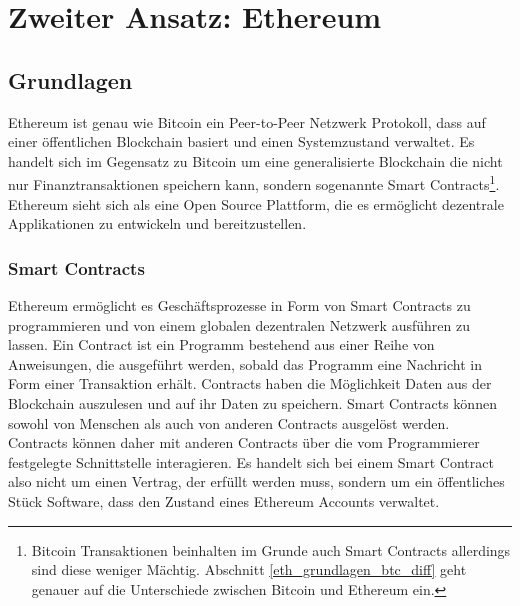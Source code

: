 \chapter{Zweiter Ansatz: Ethereum} %

\label{eth} %

\section{Grundlagen}
Ethereum ist genau wie Bitcoin ein Peer-to-Peer Netzwerk Protokoll, dass auf einer öffentlichen Blockchain basiert und einen Systemzustand verwaltet. Es handelt sich im Gegensatz zu Bitcoin um eine generalisierte Blockchain die nicht nur Finanztransaktionen speichern kann, sondern sogenannte Smart Contracts\footnote{Bitcoin Transaktionen beinhalten im Grunde auch Smart Contracts allerdings sind diese weniger Mächtig. Abschnitt \ref{eth_grundlagen_btc_diff} geht genauer auf die Unterschiede zwischen Bitcoin und Ethereum ein.}. Ethereum sieht sich als eine Open Source Plattform, die es ermöglicht dezentrale Applikationen zu entwickeln und bereitzustellen.

\subsection{Smart Contracts}
Ethereum ermöglicht es Geschäftsprozesse in Form von Smart Contracts zu programmieren und von einem globalen dezentralen Netzwerk ausführen zu lassen. Ein Contract ist ein Programm bestehend aus einer Reihe von Anweisungen, die ausgeführt werden, sobald das Programm eine Nachricht in Form einer Transaktion erhält. Contracts haben die Möglichkeit Daten aus der Blockchain auszulesen und auf ihr Daten zu speichern. Smart Contracts können sowohl von Menschen als auch von anderen Contracts ausgelöst werden. Contracts können daher mit anderen Contracts über die vom Programmierer festgelegte Schnittstelle interagieren. Es handelt sich bei einem Smart Contract also nicht um einen Vertrag, der erfüllt werden muss, sondern um ein öffentliches Stück Software, dass den Zustand eines Ethereum Accounts verwaltet.

